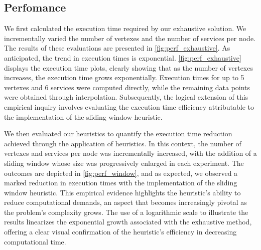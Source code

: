 \subsection{Perfomance}\label{subsec:experiments_performance}
We first calculated the execution time required by our exhaustive solution.
We incrementally varied the number of vertexes and the number of services per node.
The results of these evaluations are presented in \cref{fig:perf_exhaustive}.
As anticipated, the trend in execution times is exponential. \cref{fig:perf_exhaustive} displays the execution time plots,
clearly showing that as the number of vertexes increases, the execution time grows exponentially.
Execution times for up to 5 vertexes and 6 services were computed directly,
while the remaining data points were obtained through interpolation.
Subsequently, the logical extension of this empirical inquiry involves evaluating the execution time efficiency attributable to the implementation of the sliding window heuristic.

We then evaluated our heuristics to quantify the execution time reduction achieved through the application of heuristics.
In this context, the number of vertexes and services per node was incrementally increased,
with the addition of a sliding window whose size was progressively enlarged in each experiment.
The outcomes are depicted in \cref{fig:perf_window}, and as expected,
we observed a marked reduction in execution times with the implementation of the sliding window heuristic.
This empirical evidence highlights the heuristic's ability to reduce computational demands,
an aspect that becomes increasingly pivotal as the problem's complexity grows.
The use of a logarithmic scale to illustrate the results linearizes the exponential growth associated with the exhaustive method,
offering a clear visual confirmation of the heuristic's efficiency in decreasing computational time.


